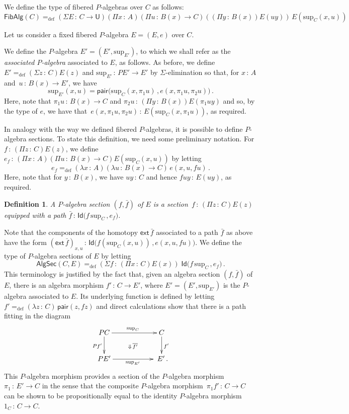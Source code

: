 \documentclass[10pt,a4paper,oneside,reqno]{amsart}
\numberwithin{equation}{section}
\theoremstyle{mythm}
\theoremstyle{mydef}
\newtheorem{definition}[theorem]{Definition}
\theoremstyle{myrmk}
\newcommand{\defeq}{=_{\mathrm{def}}}
\newcommand{\co}{\,{:}\,}
\newcommand{\ext}{\mathsf{ext}}
\newcommand{\Id}{\mathsf{Id}}
\newcommand{\pair}{\mathsf{pair}}
\newcommand{\U}{\mathsf{U}}
\renewcommand{\sup}{\mathrm{sup}}
\newcommand{\FibPalg}{\mathsf{FibAlg}}
\newcommand{\PalgSec}{\mathsf{AlgSec}}
\begin{document}
 We define the type of fibered $P$-algebras 
over $C$ as follows:
\[
\FibPalg(C) \defeq (\Sigma E \co C \to \U) (\Pi x \co A) (\Pi u \co B(x) \to C) 
 ((\Pi y \co B(x)) E(u y))\,  E(\sup_C(x,u))
 \]
  
 Let us consider a fixed fibered $P$-algebra $E = (E, e)$ over $C$. 
 
 \medskip
 
 We define the $P$-algebra $E' = (E', \sup_{E'})$, to
which we shall refer as the \emph{associated $P$-algebra} associated to $E$, as follows. As before,
we define $E' \defeq (\Sigma z \co C) E(z)$ and  $\sup_{E'} \co PE' \to E'$  by $\Sigma$-elimination 
so that, for $x \co A$ and~$u \co B(x) \to E'$, we have
\[
\sup_{E'}(x,u) = 
\pair \big( 
\sup_C(x, \pi_1 u ) \, , 
e( x, \pi_1 u, \pi_2 u) \big)  \, .
\]
Here, note that $\pi_1 u \co B(x) \to C$ and $\pi_2 u \co (\Pi y \co B(x)) E(\pi_1 u y)$ and so,
by the type of $e$, we have that~$e(x, \pi_1 u, \pi_2 u) \co E( \sup_C(x, \pi_1 u))$, as required.

In analogy with the way we defined fibered $P$-algebras, it is possible to define 
$P$-algebra sections. To state this definition, we need some preliminary notation.
For  $f \co (\Pi z \co C) E(z)$,
we define $e_f \co (\Pi x \co A)(\Pi u \co B(x) \to C) E(\sup_C(x,u))$ by letting
\begin{equation}
\label{equ:ef}
 e_f \defeq (\lambda x \co A)(\lambda u \co B(x) \to C) \, e(x, u, f u) \, .
\end{equation}
Here, note that for $y \co B(x)$, we have $u y \co C$ and hence $f u y \co E(uy)$,
as required.


\begin{definition} \label{def:fibalgsection} 
A \emph{$P$-algebra section} $(f, \bar{f})$ of $E$ is a section~$f \co (\Pi z \co C) E(z)$ equipped
with a path 
$\bar{f} \co  \Id \big( f \,  \sup_C \, , e_f \big)$.
\end{definition} 

Note that the components of the homotopy $\ext \, \bar{f}$ associated to a path $\bar{f}$ as above have the 
form $(\ext \, \bar{f})_{x,u} \co \Id \big( f(\sup_C(x,u)) \, , e(x, u, fu) \big)$.   We define the type of $P$-algebra sections of $E$ by letting
\[ 
\PalgSec(C,E)  \defeq (\Sigma f  \co (\Pi x \co C) E(x)) \; \Id \big( f \, \sup_C \, , e_f  \big) \, .
\]
This terminology is justified by the fact that, given an algebra section $(f, \bar{f})$ of $E$, there is an algebra 
morphism $f' \co C \to E'$, where  $E' = (E', \sup_{E'})$ is  the $P$-algebra associated to $E$. 
Its underlying function is defined by letting $f' \defeq (\lambda z \co C) \, \pair(z, fz)$
and direct calculations show that there is a path fitting in the diagram
\[
\xymatrix@C=2cm{
PC \ar[d]_{Pf'} \ar[r]^{\sup_C} \ar@{}[dr]|{\Downarrow \, \overline{f'}} & C \ar[d]^{f'} \\
PE' \ar[r]_{\sup_{E'} } & \; E' \, .}
\]
This $P$-algebra morphism provides
a section of the $P$-algebra morphism~$\pi_1 \co E' \to C$ in the sense that the composite $P$-algebra
morphism~$\pi_1  f' \co C \to C$ can be shown to be propositionally equal to the identity $P$-algebra
morphism~$1_C \co C \to C$. 
\end{document}
